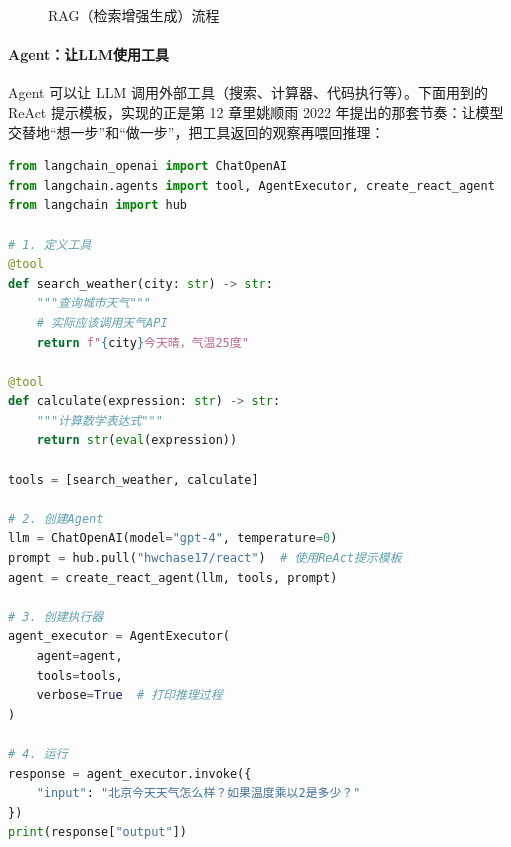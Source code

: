 \begin{figure}[htbp]
\centering
{}
\caption{RAG（检索增强生成）流程}
\end{figure}

\paragraph{Agent：让LLM使用工具}

Agent 可以让 LLM 调用外部工具（搜索、计算器、代码执行等）。下面用到的 ReAct 提示模板，实现的正是第 12 章里姚顺雨 2022 年提出的那套节奏：让模型交替地``想一步''和``做一步''，把工具返回的观察再喂回推理：

\begin{lstlisting}[language=Python, caption=创建简单的Agent]
from langchain_openai import ChatOpenAI
from langchain.agents import tool, AgentExecutor, create_react_agent
from langchain import hub

# 1. 定义工具
@tool
def search_weather(city: str) -> str:
    """查询城市天气"""
    # 实际应该调用天气API
    return f"{city}今天晴，气温25度"

@tool  
def calculate(expression: str) -> str:
    """计算数学表达式"""
    return str(eval(expression))

tools = [search_weather, calculate]

# 2. 创建Agent
llm = ChatOpenAI(model="gpt-4", temperature=0)
prompt = hub.pull("hwchase17/react")  # 使用ReAct提示模板
agent = create_react_agent(llm, tools, prompt)

# 3. 创建执行器
agent_executor = AgentExecutor(
    agent=agent, 
    tools=tools, 
    verbose=True  # 打印推理过程
)

# 4. 运行
response = agent_executor.invoke({
    "input": "北京今天天气怎么样？如果温度乘以2是多少？"
})
print(response["output"])
\end{lstlisting}


